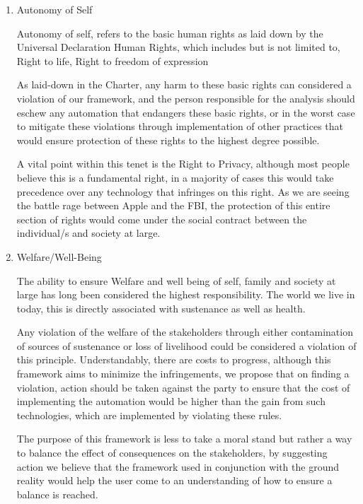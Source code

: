 \begin{enumerate}
  \item Autonomy of Self
    \begin{pointenv}
      Autonomy of self, refers to the basic human rights as laid down 
      by the Universal Declaration Human Rights\cite{assembly1948universal}, 
      which includes but is not limited to, Right to life, Right to freedom 
      of expression

      As laid-down in the Charter, any harm to these basic rights can 
      considered a violation of our framework, and the person responsible for 
      the analysis should eschew any automation that endangers these basic 
      rights, or in the worst case to mitigate these violations through 
      implementation of other practices that would ensure protection of 
      these rights to the highest degree possible.

      A vital point within this tenet is the Right to Privacy, 
      although most people believe this is a fundamental right, in a majority 
      of  cases this would take precedence over any technology that infringes 
      on this right. As we are seeing the battle rage between Apple and the 
      FBI, the protection of this entire section of rights would come under 
      the social contract between the individual/s and society at large. 
    \end{pointenv}

  \item Welfare/Well-Being
    \begin{pointenv}
      The ability to ensure Welfare and well being of self, family and 
      society at large has long been considered the highest 
      responsibility. The world we live in today, this is directly 
      associated with sustenance as well as health.

      Any violation of the welfare of the stakeholders through either 
      contamination of sources of sustenance or loss of livelihood could 
      be considered a violation of this principle. Understandably, there 
      are costs to progress, although this framework aims to minimize 
      the infringements, we propose that on finding a violation, action 
      should be taken against the party to ensure that the cost of 
      implementing the automation would be higher than the gain from such 
      technologies, which are implemented by violating these rules.

      The purpose of this framework is less to take a moral stand but 
      rather a way to balance the effect of consequences on the 
      stakeholders, by suggesting action we believe that the framework 
      used in conjunction with the ground reality would help the user 
      come to an understanding of how to ensure a balance is reached. 
    \end{pointenv}


\end{enumerate}
